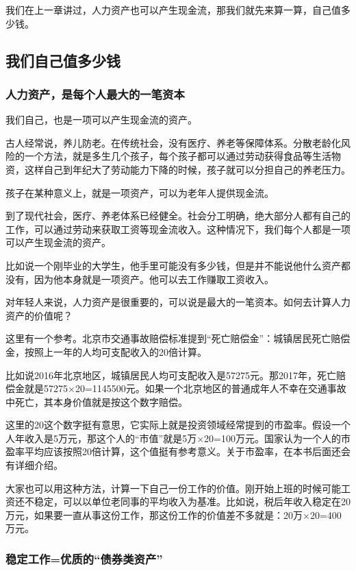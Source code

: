 \setcounter{figure}{0}\setcounter{table}{0}
我们在上一章讲过，人力资产也可以产生现金流，那我们就先来算一算，自己值多少钱。

\subsection{我们自己值多少钱}
\subsubsection{人力资产，是每个人最大的一笔资本}

我们自己，也是一项可以产生现金流的资产。

古人经常说，养儿防老。在传统社会，没有医疗、养老等保障体系。分散老龄化风险的一个方法，就是多生几个孩子，每个孩子都可以通过劳动获得食品等生活物资，这样自己到年纪大了劳动能力下降的时候，孩子就可以分担自己的养老压力。

孩子在某种意义上，就是一项资产，可以为老年人提供现金流。

到了现代社会，医疗、养老体系已经健全。社会分工明确，绝大部分人都有自己的工作，可以通过劳动来获取工资等现金流收入。这种情况下，我们每个人都是一项可以产生现金流的资产。

比如说一个刚毕业的大学生，他手里可能没有多少钱，但是并不能说他什么资产都没有，因为他本身就是一项资产。他可以去工作赚取工资收入。

对年轻人来说，人力资产是很重要的，可以说是最大的一笔资本。如何去计算人力资产的价值呢？

这里有一个参考。北京市交通事故赔偿标准提到“死亡赔偿金”：城镇居民死亡赔偿金，按照上一年的人均可支配收入的20倍计算。

比如说2016年北京地区，城镇居民人均可支配收入是57275元。那2017年，死亡赔偿金就是57275×20=1145500元。如果一个北京地区的普通成年人不幸在交通事故中死亡，其本身价值就是按这个数字赔偿。

这里的20这个数字挺有意思，它实际上就是投资领域经常提到的市盈率。假设一个人年收入是5万元，那这个人的“市值”就是5万×20=100万元。国家认为一个人的市盈率平均应该按照20倍计算，这个值挺有参考意义。关于市盈率，在本书后面还会有详细介绍。

大家也可以用这种方法，计算一下自己一份工作的价值。刚开始上班的时候可能工资还不稳定，可以以单位老同事的平均收入为基准。比如说，税后年收入稳定在20万元，如果要一直从事这份工作，那这份工作的价值差不多就是：20万×20=400万元。

\subsubsection{稳定工作=优质的“债券类资产”}

